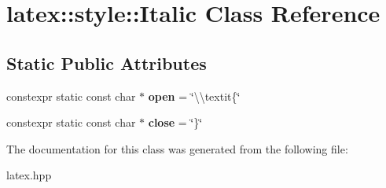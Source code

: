 \hypertarget{classlatex_1_1style_1_1Italic}{\section{latex\-:\-:style\-:\-:Italic Class Reference}
\label{classlatex_1_1style_1_1Italic}
}
\subsection*{Static Public Attributes}
\begin{DoxyCompactItemize}
\item 
\hypertarget{classlatex_1_1style_1_1Italic_a9dacb3fa2bda2a9efc06cbe306b8a1a2}{constexpr static const char $\ast$ {\bfseries open} = \char`\"{}\textbackslash{}\textbackslash{}textit\{\char`\"{}}\label{classlatex_1_1style_1_1Italic_a9dacb3fa2bda2a9efc06cbe306b8a1a2}

\item 
\hypertarget{classlatex_1_1style_1_1Italic_af84fcee42a6e6a9b49de0cba5276e609}{constexpr static const char $\ast$ {\bfseries close} = \char`\"{}\}\char`\"{}}\label{classlatex_1_1style_1_1Italic_af84fcee42a6e6a9b49de0cba5276e609}

\end{DoxyCompactItemize}


The documentation for this class was generated from the following file\-:\begin{DoxyCompactItemize}
\item 
latex.\-hpp\end{DoxyCompactItemize}
